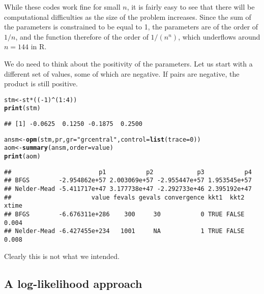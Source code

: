 \documentclass[11pt]{article}\usepackage[]{graphicx}\usepackage[]{color}
\makeatletter
\newcommand{\hlnum}[1]{\textcolor[rgb]{0.686,0.059,0.569}{#1}}%
\newcommand{\hlstr}[1]{\textcolor[rgb]{0.192,0.494,0.8}{#1}}%
\newcommand{\hlopt}[1]{\textcolor[rgb]{0,0,0}{#1}}%
\newcommand{\hlstd}[1]{\textcolor[rgb]{0.345,0.345,0.345}{#1}}%
\newcommand{\hlkwb}[1]{\textcolor[rgb]{0.69,0.353,0.396}{#1}}%
\newcommand{\hlkwc}[1]{\textcolor[rgb]{0.333,0.667,0.333}{#1}}%
\newcommand{\hlkwd}[1]{\textcolor[rgb]{0.737,0.353,0.396}{\textbf{#1}}}%
\newenvironment{kframe}{%
 \def\at@end@of@kframe{}%
 \ifinner\ifhmode%
  \def\at@end@of@kframe{\end{minipage}}%
  \begin{minipage}{\columnwidth}%
 \fi\fi%
 \def\FrameCommand##1{\hskip\@totalleftmargin \hskip-\fboxsep
 \colorbox{shadecolor}{##1}\hskip-\fboxsep
     \hskip-\linewidth \hskip-\@totalleftmargin \hskip\columnwidth}%
 \MakeFramed {\advance\hsize-\width
   \@totalleftmargin\z@ \linewidth\hsize
   \@setminipage}}%
 {\par\unskip\endMakeFramed%
 \at@end@of@kframe}
\newenvironment{knitrout}{}{} %
\newcommand{\R}{{\sf R}}
\makeatother
\begin{document}
While these codes work fine for small $n$, it is fairly easy to see that there will be 
computational difficulties as the size of the problem increases. Since the sum of the 
parameters is constrained to be equal to 1, the parameters are of the order of $1/n$,
and the function therefore of the order of $1/(n^n)$, which underflows around $n=144$ in 
\R. 

We do need to think about the positivity of the parameters. Let us start with 
a different set of values, some of which are negative. If pairs are negative, the 
product is still positive.

\begin{knitrout}\scriptsize
{}\color{fgcolor}\begin{kframe}
\begin{alltt}
\hlstd{stm} \hlkwb{<-} \hlstd{st}\hlopt{*}\hlstd{((}\hlopt{-}\hlnum{1}\hlstd{)}\hlopt{^}\hlstd{(}\hlnum{1}\hlopt{:}\hlnum{4}\hlstd{))}
\hlkwd{print}\hlstd{(stm)}
\end{alltt}
\begin{verbatim}
## [1] -0.0625  0.1250 -0.1875  0.2500
\end{verbatim}
\begin{alltt}
\hlstd{ansm}\hlkwb{<-}\hlkwd{opm}\hlstd{(stm, pr,} \hlkwc{gr}\hlstd{=}\hlstr{"grcentral"}\hlstd{,} \hlkwc{control}\hlstd{=}\hlkwd{list}\hlstd{(}\hlkwc{trace}\hlstd{=}\hlnum{0}\hlstd{))}
\hlstd{aom} \hlkwb{<-} \hlkwd{summary}\hlstd{(ansm,} \hlkwc{order}\hlstd{=value)}
\hlkwd{print}\hlstd{(aom)}
\end{alltt}
\begin{verbatim}
##                        p1           p2            p3           p4
## BFGS        -2.954862e+57 2.003069e+57 -2.955447e+57 1.953545e+57
## Nelder-Mead -5.411717e+47 3.177738e+47 -2.292733e+46 2.395192e+47
##                      value fevals gevals convergence kkt1  kkt2 xtime
## BFGS        -6.676311e+286    300     30           0 TRUE FALSE 0.004
## Nelder-Mead -6.427455e+234   1001     NA           1 TRUE FALSE 0.008
\end{verbatim}
\end{kframe}
\end{knitrout}

Clearly this is not what we intended.

\subsection{A log-likelihood approach}
\end{document}
